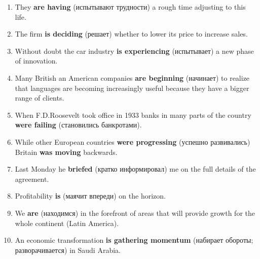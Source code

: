 \documentclass[main.tex]{subfiles}
\begin{document}

\begin{enumerate}[nosep,leftmargin=*]
	\itemsep\eitsp
	\item They \textbf{are having} (испытывают трудности) a rough time adjusting to this life.
	\item The firm \textbf{is deciding} (решает) whether to lower its price to increase sales.
	\item Without doubt the car industry \textbf{is experiencing} (испытывает) a new phase of innovation.
	\item Many British an American companies \textbf{are beginning} (начинает) to realize that languages are becoming increasingly useful because they have a bigger range of clients.
	\item When F.D.Roosevelt took office in 1933 banks in many parts of the country \textbf{were failing} (становились банкротами).
	\item While other European countries \textbf{were progressing} (успешно развивались) Britain \textbf{was moving} backwards.
	\item Last Monday he \textbf{briefed} (кратко информировал) me on the full details of the agreement.
	\item Profitability \textbf{is} (маячит впереди) on the horizon.
	\item We \textbf{are} (находимся) in the forefront of areas that will provide growth for the whole continent (Latin America).
	\item An economic transformation \textbf{is gathering momentum} (набирает обороты; разворачивается) in Saudi Arabia.
\end{enumerate}
\ 

\end{document}
